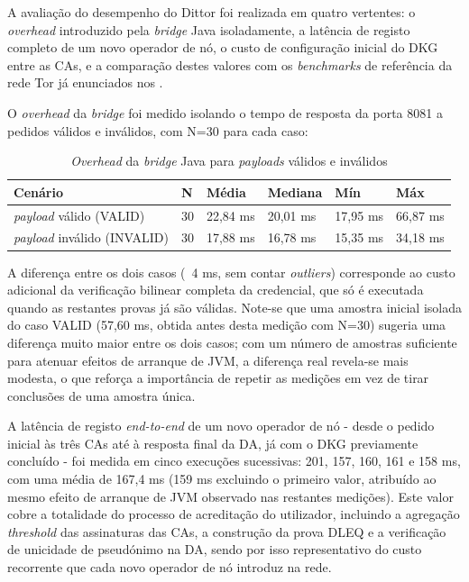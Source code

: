 A avaliação do desempenho do Dittor foi realizada em quatro vertentes: o \textit{overhead} introduzido pela \textit{bridge} Java isoladamente, a latência de registo completo de um novo operador de nó, o custo de configuração inicial do DKG entre as CAs, e a comparação destes valores com os \textit{benchmarks} de referência da rede Tor já enunciados nos .

O \textit{overhead} da \textit{bridge} foi medido isolando o tempo de resposta da porta 8081 a pedidos válidos e inválidos, com N=30 para cada caso:

\begin{table}[h]
    \centering
    \renewcommand{\arraystretch}{1.4}
    \begin{tabular}{|p{}|p{}|p{}|p{}|p{}|p{}|}
    \hline
    \textbf{Cenário} & \textbf{N} & \textbf{Média} & \textbf{Mediana} & \textbf{Mín} & \textbf{Máx} \\
    \hline
    \textit{payload} válido (VALID) & 30 & 22,84 ms & 20,01 ms & 17,95 ms & 66,87 ms \\
    \hline
    \textit{payload} inválido (INVALID) & 30 & 17,88 ms & 16,78 ms & 15,35 ms & 34,18 ms \\
    \hline
    \end{tabular}
    \caption{\textit{Overhead} da \textit{bridge} Java para \textit{payloads} válidos e inválidos}
    \label{tab:overhead_bridge}
\end{table}

A diferença entre os dois casos (~4 ms, sem contar \textit{outliers}) corresponde ao custo adicional da verificação bilinear completa da credencial, que só é executada quando as restantes provas já são válidas. Note-se que uma amostra inicial isolada do caso VALID (57,60 ms, obtida antes desta medição com N=30) sugeria uma diferença muito maior entre os dois casos; com um número de amostras suficiente para atenuar efeitos de arranque de JVM, a diferença real revela-se mais modesta, o que reforça a importância de repetir as medições em vez de tirar conclusões de uma amostra única.

A latência de registo \textit{end-to-end} de um novo operador de nó - desde o pedido inicial às três CAs até à resposta final da DA, já com o DKG previamente concluído - foi medida em cinco execuções sucessivas: 201, 157, 160, 161 e 158 ms, com uma média de 167,4 ms (159 ms excluindo o primeiro valor, atribuído ao mesmo efeito de arranque de JVM observado nas restantes medições). Este valor cobre a totalidade do processo de acreditação do utilizador, incluindo a agregação \textit{threshold} das assinaturas das CAs, a construção da prova DLEQ e a verificação de unicidade de pseudónimo na DA, sendo por isso representativo do custo recorrente que cada novo operador de nó introduz na rede.

